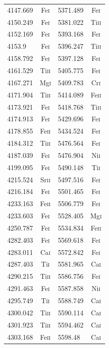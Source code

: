 \begin{longtable}[c]{|l|c|l|c|}
4147.669 & Fe\textsc{i} & 5371.489 & Fe\textsc{i}\\  
4150.249 & Fe\textsc{i} & 5381.022 & Ti\textsc{ii}\\ 
4152.169 & Fe\textsc{i} & 5393.168 & Fe\textsc{i}\\  
4153.9 & Fe\textsc{i} & 5396.247 & Ti\textsc{ii}\\   
4158.792 & Fe\textsc{i} & 5397.128 & Fe\textsc{i}\\  
4161.529 & Ti\textsc{ii} & 5405.775 & Fe\textsc{i}\\ 
4167.271 & Mg\textsc{i} & 5409.783 & Cr\textsc{i}\\  
4171.904 & Ti\textsc{ii} & 5414.089 & Fe\textsc{ii}\\
4173.921 & Fe\textsc{i} & 5418.768 & Ti\textsc{ii}\\ 
4174.913 & Fe\textsc{i} & 5429.696 & Fe\textsc{i}\\  
4178.855 & Fe\textsc{ii} & 5434.524 & Fe\textsc{i}\\ 
4184.312 & Ti\textsc{ii} & 5476.564 & Fe\textsc{i}\\ 
4187.039 & Fe\textsc{i} & 5476.904 & Ni\textsc{i}\\  
4199.095 & Fe\textsc{i} & 5490.148 & Ti\textsc{i}\\  
4215.524 & Sr\textsc{ii} & 5497.516 & Fe\textsc{i}\\ 
4216.184 & Fe\textsc{i} & 5501.465 & Fe\textsc{i}\\  
4233.163 & Fe\textsc{ii} & 5506.779 & Fe\textsc{i}\\ 
4233.603 & Fe\textsc{i} & 5528.405 & Mg\textsc{i}\\  
4250.787 & Fe\textsc{i} & 5534.834 & Fe\textsc{ii}\\ 
4282.403 & Fe\textsc{i} & 5569.618 & Fe\textsc{i}\\  
4283.011 & Ca\textsc{i} & 5572.842 & Fe\textsc{i}\\  
4287.403 & Ti\textsc{i} & 5581.965 & Ca\textsc{i}\\  
4290.215 & Ti\textsc{ii} & 5586.756 & Fe\textsc{i}\\ 
4291.463 & Fe\textsc{i} & 5587.858 & Ni\textsc{i}\\  
4295.749 & Ti\textsc{i} & 5588.749 & Ca\textsc{i}\\  
4300.042 & Ti\textsc{ii} & 5590.114 & Ca\textsc{i}\\ 
4301.923 & Ti\textsc{ii} & 5594.462 & Ca\textsc{i}\\ 
4303.168 & Fe\textsc{ii} & 5598.48 & Ca\textsc{i}\\  

\end{longtable}
